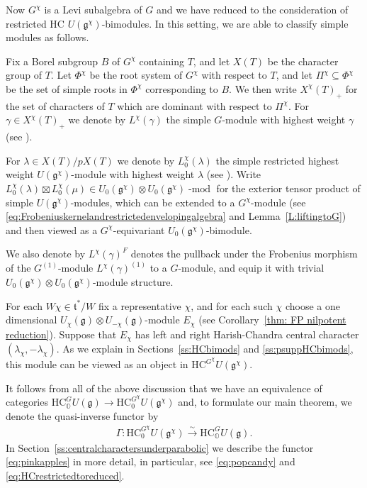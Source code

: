 \documentclass[twoside,12pt,reqno]{amsart}
\theoremstyle{remark}
\numberwithin{equation}{section}
\def\isoto{\overset{\sim}{\longrightarrow}}
\def\lmod{\!\operatorname{-mod}}
\def\O{{\mathbb O}}
\def\HC{\mathrm{HC}}
\def\g{{\mathfrak g}}
\def\t{\mathfrak t}
\begin{document}
Now $G^\chi$ is a Levi subalgebra of $G$ and we have reduced to the consideration of restricted HC $U(\g^\chi)$-bimodules. In this setting, we are able to classify simple modules as follows. 

Fix a Borel subgroup $B$ of $G^\chi$ containing $T$, and let $X(T)$ be the character group of $T$. Let $\Phi^\chi$ be the root system of $G^\chi$ with respect to $T$, and let $\Pi^\chi\subseteq \Phi^\chi$ be the set of simple roots in $\Phi^\chi$ corresponding to $B$. We then write $X^\chi(T)_{+}$ for the set of characters of $T$ which are dominant with respect to $\Pi^\chi$. For $\gamma\in X^\chi(T)_{+}$ we denote by $L^\chi(\gamma)$ the simple $G$-module with highest weight $\gamma$ (see \cite[II.2.4]{JanRAGS}).

For $\lambda\in X(T)/pX(T)$ we denote by $L_0^\chi(\lambda)$ the simple restricted highest weight $U(\g^\chi)$-module with highest weight $\lambda$ (see \cite[]{JaLA}). 
 Write $L_0^\chi(\lambda) \boxtimes L_0^\chi(\mu) \in U_0(\g^\chi) \otimes U_0(\g^\chi)\lmod$ for the exterior tensor product of simple $U(\g^\chi)$-modules, which can be extended to a $G^\chi$-module (see \eqref{eq:Frobeniuskernelandrestrictedenvelopingalgebra} and Lemma~\ref{L:liftingtoG}) and then viewed as a $G^\chi$-equivariant $U_0(\g^\chi)$-bimodule.

We also denote by $L^\chi(\gamma)^F$ denotes the pullback under the Frobenius morphism of the $G^{(1)}$-module $L^\chi(\gamma)^{(1)}$ to a $G$-module, and equip it with trivial $U_0(\g^\chi) \otimes U_0(\g^\chi)$-module structure.

For each $W \chi \in \t^* / W$ fix a representative $\chi$, and for each such $\chi$ choose a one dimensional $U_\chi(\g)\otimes U_{-\chi}(\g)$-module $E_\chi$ (see Corollary~\ref{thm: FP nilpotent reduction}). Suppose that $E_\chi$ has left and right Harish-Chandra central character $(\lambda_\chi, -\lambda_\chi)$. As we explain in Sections~\ref{ss:HCbimods} and \ref{ss:psuppHCbimods}, this module can be viewed as an object in $\HC^{G^\chi} U(\g^\chi)$.

It follows from all of the above discussion that we have an equivalence of categories $\HC_\O^G U(\g) \to \HC_0^{G^\chi} U(\g^\chi)$ and, to formulate our main theorem, we denote the quasi-inverse functor by 
\begin{eqnarray}
\label{eq:pinkapples}
    \Gamma \colon \HC_0^{G^\chi} U(\g^\chi) \isoto \HC_\O^{G} U(\g).
\end{eqnarray}
In Section~\ref{ss:centralcharactersunderparabolic} we describe the functor \eqref{eq:pinkapples} in more detail, in particular, see \eqref{eq:popcandy} and \eqref{eq:HCrestrictedtoreduced}.
\end{document}
